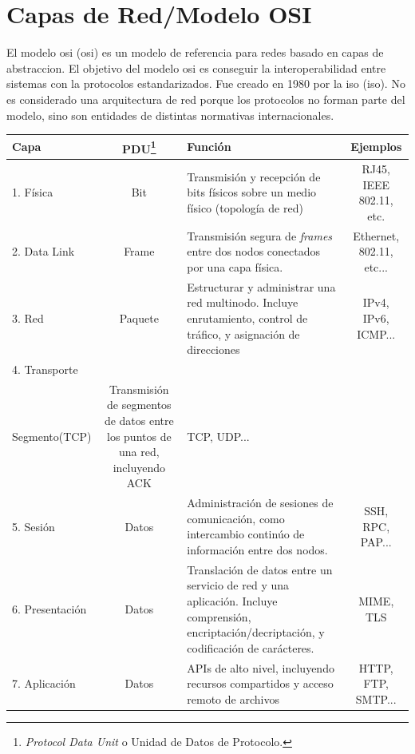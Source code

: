 \documentclass[a4paper, 11pt]{report} %
\newcommand{\acr}[1]{\acrshort{#1} (\acrlong{#1})}
\begin{document}
\section{Capas de Red/Modelo OSI}
El modelo \acr{osi} es un modelo de referencia para redes basado en \gls{capas de abstraccion}.
El objetivo del modelo \acrshort{osi} es conseguir la interoperabilidad entre sistemas con la protocolos estandarizados. Fue creado en 1980 por la \acr{iso}. No es considerado una arquitectura de red porque los protocolos no forman parte del modelo, sino son entidades de distintas normativas internacionales.
\vspace*{5pt}

\renewcommand{\arraystretch}{1.1}
\noindent
\begin{tabularx}{\linewidth}{ | l >{\footnotesize}c >{\footnotesize}X >{\footnotesize}c | }
	\rowcolor{header} \hline
	\textbf{Capa} & \textbf{PDU\footnote{\textit{Protocol Data Unit} o Unidad de Datos de Protocolo.}} & \textbf{Función} & \textbf{Ejemplos} \\ \hline
	1. Física & Bit & Transmisión y recepción de bits físicos sobre un medio físico (topología de red) & 	 RJ45, IEEE 802.11, etc. \\
	\label{osi}
	2. Data Link & Frame & Transmisión segura de \textit{frames} entre dos nodos conectados por una capa física. & Ethernet, 802.11, etc...\\
	3. Red & Paquete & Estructurar y administrar una red multinodo. Incluye enrutamiento, control de tráfico, y asignación de direcciones & IPv4, IPv6, ICMP... \\
	4. Transporte & \begin{tabular}[t]{@{}c@{}}Datagrama(UDP)\\Segmento(TCP)  \end{tabular} &
	Transmisión de segmentos de datos entre los puntos de una red, incluyendo ACK & TCP, UDP...\\
	5. Sesión & Datos & Administración de sesiones de comunicación, como intercambio continúo de información entre dos nodos. & SSH, RPC, PAP...\\ 
	6. Presentación & Datos & Translación de datos entre un servicio de red y una aplicación. Incluye comprensión, encriptación/decriptación, y codificación de carácteres. & MIME, TLS \\
	7. Aplicación & Datos & APIs de alto nivel, incluyendo recursos compartidos y acceso remoto de archivos & HTTP, FTP, SMTP... \\ \hline
\end{tabularx}
\end{document}
